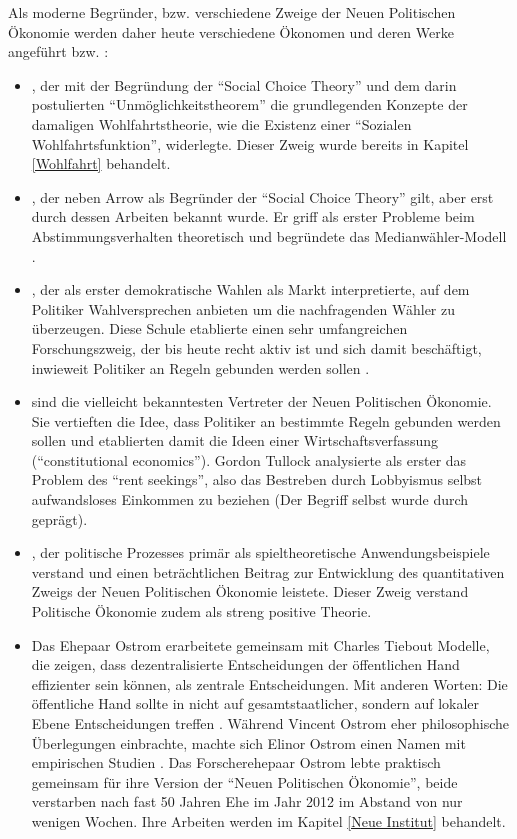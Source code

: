 Als moderne Begründer, bzw. verschiedene Zweige der Neuen Politischen Ökonomie werden daher heute verschiedene Ökonomen und deren Werke angeführt \parencite[S. 31]{Grofman2004} bzw. \parencite{Mitchell1988}:
\begin{itemize}
	\item \textcite{Arrow1951, Arrow1950}, der mit der Begründung der "`Social Choice Theory"' und dem darin postulierten "`Unmöglichkeitstheorem"' die grundlegenden Konzepte der damaligen Wohlfahrtstheorie, wie die Existenz einer "`Sozialen Wohlfahrtsfunktion"', widerlegte. Dieser Zweig wurde bereits in Kapitel \ref{Wohlfahrt} behandelt.
	\item \textcite{Black1948a, Black1958}, der neben Arrow als Begründer der "`Social Choice Theory"' gilt, aber erst durch dessen Arbeiten bekannt wurde. Er griff als erster Probleme beim Abstimmungsverhalten theoretisch und begründete das Medianwähler-Modell \parencite{Black1948a}.
	\item \textcite{Downs1957b, Downs1957}, der als erster demokratische Wahlen als Markt interpretierte, auf dem Politiker Wahlversprechen anbieten um die nachfragenden Wähler zu überzeugen. Diese Schule etablierte einen sehr umfangreichen Forschungszweig, der bis heute recht aktiv ist und sich damit beschäftigt, inwieweit Politiker an Regeln gebunden werden sollen \parencite[S. 523]{Snowdon2005}.
	\item \textcite{Buchanan1962} sind die vielleicht bekanntesten Vertreter der Neuen Politischen Ökonomie. Sie vertieften die Idee, dass Politiker an bestimmte Regeln gebunden werden sollen und etablierten damit die Ideen einer Wirtschaftsverfassung ("`constitutional economics"'). Gordon Tullock analysierte als erster das Problem des "`rent seekings"', also das Bestreben durch Lobbyismus selbst aufwandsloses Einkommen zu beziehen (Der Begriff selbst wurde durch \textcite{Krueger1974} geprägt).
	\item \textcite{Riker1962}, der politische Prozesses primär als spieltheoretische Anwendungsbeispiele verstand und einen beträchtlichen Beitrag zur Entwicklung des quantitativen Zweigs der Neuen Politischen Ökonomie leistete. Dieser Zweig verstand Politische Ökonomie zudem als streng positive Theorie.
	\item Das Ehepaar Ostrom erarbeitete gemeinsam mit Charles Tiebout Modelle, die zeigen, dass dezentralisierte Entscheidungen der öffentlichen Hand effizienter sein können, als zentrale Entscheidungen. Mit anderen Worten: Die öffentliche Hand sollte in nicht auf gesamtstaatlicher, sondern auf lokaler Ebene Entscheidungen treffen \parencite{Ostrom1961, Ostrom1971}. Während Vincent Ostrom eher philosophische Überlegungen einbrachte, machte sich Elinor Ostrom einen Namen mit empirischen Studien \parencite[S. 110]{Mitchell1988}. Das Forscherehepaar Ostrom lebte praktisch gemeinsam für ihre Version der "`Neuen Politischen Ökonomie"', beide verstarben nach fast 50 Jahren Ehe im Jahr 2012 im Abstand von nur wenigen Wochen. Ihre Arbeiten werden im Kapitel \ref{Neue Institut} behandelt.
\end{itemize}

